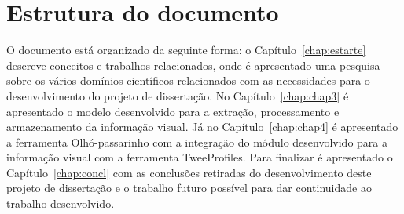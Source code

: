 \section{Estrutura do documento} \label{sec:struct}

O documento está organizado da seguinte forma: o Capítulo~\ref{chap:estarte} descreve conceitos e trabalhos relacionados, onde é apresentado uma pesquisa sobre os vários domínios científicos relacionados com as necessidades para o desenvolvimento do projeto de dissertação. No Capítulo~\ref{chap:chap3} é apresentado o modelo desenvolvido para a extração, processamento e armazenamento da informação visual. Já no Capítulo~\ref{chap:chap4} é apresentado a ferramenta Olhó-passarinho com a integração do módulo desenvolvido para a informação visual com a ferramenta TweeProfiles. Para finalizar é apresentado o Capítulo~\ref{chap:concl} com as conclusões retiradas do desenvolvimento deste projeto de dissertação e o trabalho futuro possível para dar continuidade ao trabalho desenvolvido.
